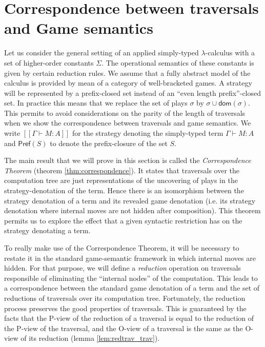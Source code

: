 \documentclass{llncs}
\newcommand{\lsem}{[\![} %
\newcommand{\rsem}{]\!]} %
\newcommand{\sem}[1]{{\lsem #1 \rsem}}
\newcommand\union{\cup}
\newcommand\prefset{\textsf{Pref}}
\begin{document}
\section{Correspondence between traversals and Game semantics}
\label{sec:assumptions}


Let us consider the general setting of an applied simply-typed $\lambda$-calculus with a set of higher-order constants $\Sigma$. The operational semantics of these constants is given by certain reduction rules.
We assume that a fully abstract model of the calculus is provided by mean of a category of well-bracketed games.
A strategy will be represented by a prefix-closed set instead of an ``even length
prefix''-closed set. In practice this means that we replace the set
of plays $\sigma$ by $\sigma \union \textsf{dom}(\sigma)$. This
permits to avoid considerations on the parity of the length of
traversals when we show the correspondence between traversals and
game semantics. We write $\sem{\Gamma \vdash M : A}$ for the strategy denoting the simply-typed term
$\Gamma \vdash M : A$ and $\prefset(S)$ to denote the
prefix-closure of the set $S$.


The main result that we will prove in this section is called the
\emph{Correspondence Theorem} (theorem \ref{thm:correspondence}). It
states that traversals over the computation tree are just
representations of the uncovering of plays in the
strategy-denotation of the term. Hence there is an isomorphism
between the strategy denotation of a term and its revealed game
denotation (i.e. its strategy denotation where internal moves are
not hidden after composition). This theorem permits us to explore
the effect that a given syntactic restriction has on the strategy
denotating a term.

To really make use of the Correspondence Theorem, it will be
necessary to restate it in the standard game-semantic framework in
which internal moves are hidden. For that purpose, we will define a
\emph{reduction} operation on traversals responsible of eliminating
the ``internal nodes'' of the computation. This leads to a
correspondence between the standard game denotation of a term and
the set of reductions of traversals over its computation tree.
Fortunately, the reduction process preserves the good properties of
traversals. This is guaranteed by the facts that the P-view of the
reduction of a traversal is equal to the reduction of the P-view of
the traversal, and the O-view of a traversal is the same as the
O-view of its reduction (lemma \ref{lem:redtrav_trav}). \vspace{8pt}
\end{document}
